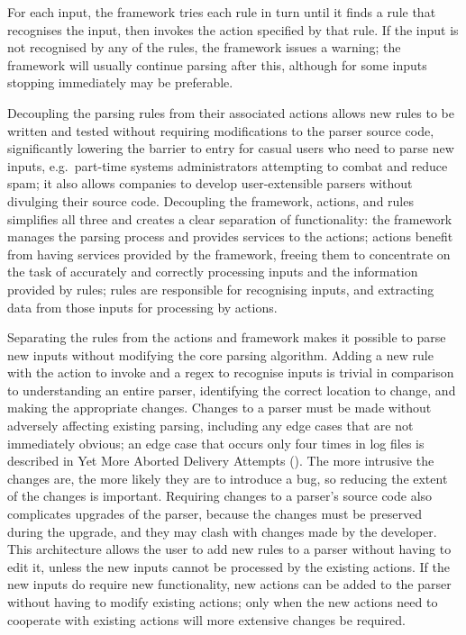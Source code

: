 For each input, the framework tries each rule in turn until it finds a rule
that recognises the input, then invokes the action specified by that rule.
If the input is not recognised by any of the rules, the framework issues a
warning; the framework will usually continue parsing after this, although
for some inputs stopping immediately may be preferable.

Decoupling the parsing rules from their associated actions allows new rules
to be written and tested without requiring modifications to the parser
source code, significantly lowering the barrier to entry for casual users
who need to parse new inputs, e.g.\ part-time systems administrators
attempting to combat and reduce spam; it also allows companies to develop
user-extensible parsers without divulging their source code.  Decoupling
the framework, actions, and rules simplifies all three and creates a clear
separation of functionality: the framework manages the parsing process and
provides services to the actions; actions benefit from having services
provided by the framework, freeing them to concentrate on the task of
accurately and correctly processing inputs and the information provided by
rules; rules are responsible for recognising inputs, and extracting data
from those inputs for processing by actions.

Separating the rules from the actions and framework makes it possible to
parse new inputs without modifying the core parsing algorithm.  Adding a
new rule with the action to invoke and a regex to recognise inputs is
trivial in comparison to understanding an entire parser, identifying the
correct location to change, and making the appropriate changes.  Changes to
a parser must be made without adversely affecting existing parsing,
including any edge cases that are not immediately obvious; an edge case
that occurs only four times in \numberOFlogFILES{} log files is described
in Yet More Aborted Delivery Attempts ().  The more intrusive the changes are, the more likely
they are to introduce a bug, so reducing the extent of the changes is
important.  Requiring changes to a parser's source code also complicates
upgrades of the parser, because the changes must be preserved during the
upgrade, and they may clash with changes made by the developer.  This
architecture allows the user to add new rules to a parser without having to
edit it, unless the new inputs cannot be processed by the existing actions.
If the new inputs do require new functionality, new actions can be added to
the parser without having to modify existing actions; only when the new
actions need to cooperate with existing actions will more extensive changes
be required.

